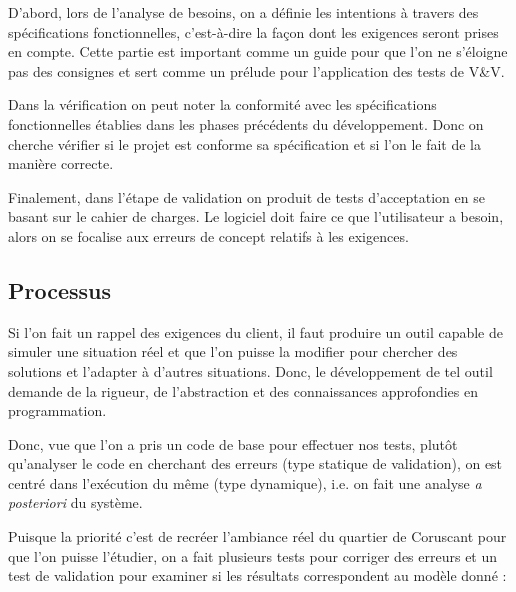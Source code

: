 \documentclass[12pt]{article} %
\begin{document}
D'abord, lors de l'analyse de besoins, on a définie les intentions à travers  des spécifications fonctionnelles, c'est-à-dire la façon dont les exigences seront prises en compte. Cette partie est important comme un guide pour que l'on ne s'éloigne pas des consignes et sert comme un prélude pour l'application des tests de V\&V.

Dans la vérification on peut noter la conformité avec les spécifications fonctionnelles établies dans les phases précédents du développement. Donc on cherche vérifier si le projet est conforme sa spécification et si l'on le fait de la manière correcte.

Finalement, dans l'étape de validation on produit de tests d'acceptation en se basant sur le cahier de charges. Le logiciel doit faire ce que l'utilisateur a besoin, alors on se focalise aux erreurs de concept relatifs à les exigences.


\subsection{Processus}
Si l'on fait un rappel des exigences du client, il faut produire un outil capable de simuler une situation réel et que l'on puisse la modifier pour chercher des solutions et l'adapter à d'autres situations. Donc, le développement de tel outil demande de la rigueur, de l'abstraction et des connaissances approfondies en programmation.

Donc, vue que l'on a pris un code de base pour effectuer nos tests, plutôt qu'analyser le code en cherchant des erreurs (type statique de validation), on est centré dans l'exécution du même (type dynamique), i.e. on fait une analyse \textit{a posteriori} du système.

Puisque la priorité c'est de recréer l'ambiance réel du quartier de Coruscant pour que l'on puisse l'étudier, on a fait plusieurs tests pour corriger des erreurs et un test de validation pour examiner si les résultats correspondent au modèle donné :
\end{document}

